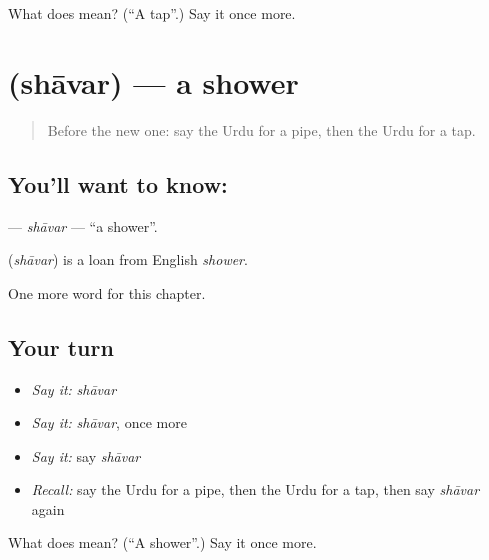 \begin{tcolorbox}[breakable,colback=teal!4,colframe=teal!35!black,title={Before you move on}]
What does  mean? (\textquotedblleft{}A tap\textquotedblright{}.) Say it once more.
\end{tcolorbox}
\section[\texorpdfstring{\ur{شاور} (shāvar)}{شاور (shāvar)}]{ (shāvar) — a shower}

\label{lesson:UR-C258-shavar}



\begin{quote}
Before the new one: say the Urdu for a pipe, then the Urdu for a tap.
\end{quote}

\subsection*{You'll want to know: }
\textbf{} — \emph{shāvar} — \textquotedblleft{}a shower\textquotedblright{}.

\begin{cousinweb}
\textbf{} (\emph{shāvar}) is a loan from English \emph{shower}.
\end{cousinweb}

\begin{grammarlens}[title={What you've built}]
One more word for this chapter.
\end{grammarlens}

\subsection*{Your turn}
\begin{itemize}
\raggedright
  \item \emph{Say it:} \emph{shāvar}
  \item \emph{Say it:} \emph{shāvar}, once more
  \item \emph{Say it:} say \emph{shāvar}
  \item \emph{Recall:} say the Urdu for a pipe, then the Urdu for a tap, then say \emph{shāvar} again
\end{itemize}

\begin{tcolorbox}[breakable,colback=teal!4,colframe=teal!35!black,title={Before you move on}]
What does  mean? (\textquotedblleft{}A shower\textquotedblright{}.) Say it once more.
\end{tcolorbox}
